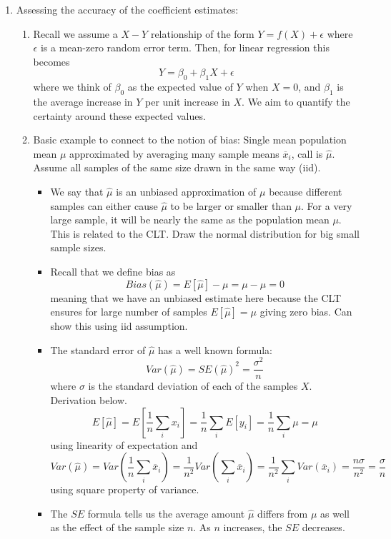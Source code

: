 \documentclass{article}
\begin{document}
\begin{enumerate}
\begin{enumerate}
\end{enumerate}

\item Assessing the accuracy of the coefficient estimates:
\begin{enumerate}
\item Recall we assume a $X-Y$ relationship of the form $Y=f(X) + \epsilon$ where $\epsilon$ is a mean-zero random error term. Then, for linear regression this becomes
\[
Y = \beta_0 + \beta_1 X + \epsilon
\]
where we think of $\beta_0$ as the expected value of $Y$ when $X=0$, and $\beta_1$ is the average increase in $Y$ per unit increase in $X$. We aim to quantify the certainty around these expected values.

\item Basic example to connect to the notion of bias: Single mean population mean $\mu$ approximated by averaging many sample means $\overline{x}_i$, call is $\hat{\mu}$. Assume all samples of the same size drawn in the same way (iid).
\begin{itemize}
\item We say that $\hat{\mu}$ is an unbiased approximation of $\mu$ because different samples can either cause $\hat{\mu}$ to be larger or smaller than $\mu$. For a very large sample, it will be nearly the same as the population mean $\mu$. This is related to the CLT. Draw the normal distribution for big small sample sizes.
\item Recall that we define bias as 
\[
Bias(\hat{\mu}) = E[\hat{\mu}] - \mu = \mu - \mu = 0
\]
meaning that we have an unbiased estimate here because the CLT ensures for large number of samples $E[\hat{\mu}]=\mu$ giving zero bias. Can show this using iid assumption.
\item The standard error of $\hat{\mu}$ has a well known formula:
\[
Var(\hat{\mu}) = SE(\hat{\mu})^2 = \frac{\sigma^2}{n}
\]
where $\sigma$ is the standard deviation of each of the samples $X$. Derivation below.
\[
E[\hat{\mu}] = E\left[ \frac{1}{n} \sum_i x_i \right] = \frac{1}{n} \sum_i E[y_i] = \frac{1}{n} \sum_i \mu = \mu
\]
using linearity of expectation and
\[
Var(\hat{\mu}) = Var \left( \frac{1}{n} \sum_i \overline{x}_i \right) =  \frac{1}{n^2} Var \left( \sum_i \overline{x}_i \right)
 =  \frac{1}{n^2} \sum_i Var(\overline{x}_i) = \frac{n \sigma}{n^2} = \frac{\sigma}{n}
\]
using square property of variance.
\item The $SE$ formula tells us the average amount $\hat{\mu}$ differs from $\mu$ as well as the effect of the sample size $n$. As $n$ increases, the $SE$ decreases. 
\end{itemize}


\end{enumerate}
\end{enumerate}
\end{document}
